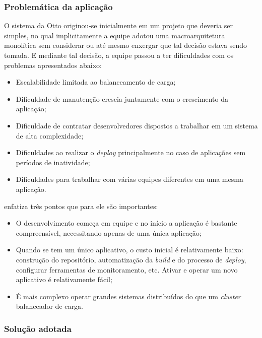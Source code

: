 \subsubsection{Problemática da aplicação}

O sistema da Otto originou-se inicialmente em um projeto que deveria ser simples, no qual
implicitamente a equipe adotou uma macroarquitetura monolítica sem considerar ou até mesmo enxergar
que tal decisão estava sendo tomada. E mediante tal decisão, a equipe passou a ter dificuldades
com os problemas apresentados abaixo:

\begin{itemize}
    \item Escalabilidade limitada ao balanceamento de carga;
    \item Dificuldade de manutenção crescia juntamente com o crescimento da aplicação;
    \item Dificuldade de contratar desenvolvedores dispostos a trabalhar em um sistema de alta
        complexidade;
    \item Dificuldades ao realizar o \textit{deploy} principalmente no caso de aplicações sem
        períodos de inatividade;
    \item Dificuldades para trabalhar com várias equipes diferentes em uma mesma aplicação.
\end{itemize}

 enfatiza três pontos que para ele são importantes:

\begin{itemize}
    \item O desenvolvimento começa em equipe e no início a aplicação é bastante compreensível,
        necessitando apenas de uma única aplicação;
    \item Quando se tem um único aplicativo, o custo inicial é relativamente baixo: construção do
        repositório, automatização da \textit{build} e do processo de \textit{deploy}, configurar
        ferramentas de monitoramento, etc. Ativar e operar um novo aplicativo é relativamente fácil;
    \item É mais complexo operar grandes sistemas distribuídos do que um \textit{cluster}
        balanceador de carga.
\end{itemize}

\subsubsection{Solução adotada}

